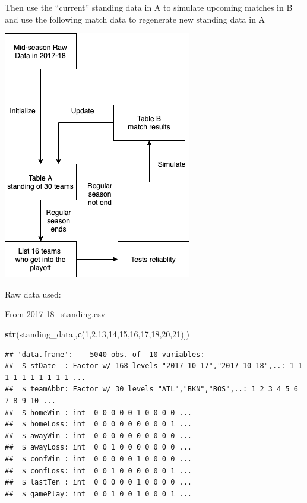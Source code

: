 \documentclass[]{article}
\newenvironment{Shaded}{\begin{snugshade}}{\end{snugshade}}
\newcommand{\KeywordTok}[1]{\textcolor[rgb]{0.13,0.29,0.53}{\textbf{#1}}}
\newcommand{\DecValTok}[1]{\textcolor[rgb]{0.00,0.00,0.81}{#1}}
\newcommand{\NormalTok}[1]{#1}
\begin{document}
Then use the ``current'' standing data in A to simulate upcoming matches
in B and use the following match data to regenerate new standing data in
A

\begin{center}\includegraphics{methods_flowchart} \end{center}

Raw data used:

From 2017-18\_standing.csv

\begin{Shaded}
\begin{Highlighting}[]
\KeywordTok{str}\NormalTok{(standing_data[,}\KeywordTok{c}\NormalTok{(}\DecValTok{1}\NormalTok{,}\DecValTok{2}\NormalTok{,}\DecValTok{13}\NormalTok{,}\DecValTok{14}\NormalTok{,}\DecValTok{15}\NormalTok{,}\DecValTok{16}\NormalTok{,}\DecValTok{17}\NormalTok{,}\DecValTok{18}\NormalTok{,}\DecValTok{20}\NormalTok{,}\DecValTok{21}\NormalTok{)])}
\end{Highlighting}
\end{Shaded}

\begin{verbatim}
## 'data.frame':    5040 obs. of  10 variables:
##  $ stDate  : Factor w/ 168 levels "2017-10-17","2017-10-18",..: 1 1 1 1 1 1 1 1 1 1 ...
##  $ teamAbbr: Factor w/ 30 levels "ATL","BKN","BOS",..: 1 2 3 4 5 6 7 8 9 10 ...
##  $ homeWin : int  0 0 0 0 0 1 0 0 0 0 ...
##  $ homeLoss: int  0 0 0 0 0 0 0 0 0 1 ...
##  $ awayWin : int  0 0 0 0 0 0 0 0 0 0 ...
##  $ awayLoss: int  0 0 1 0 0 0 0 0 0 0 ...
##  $ confWin : int  0 0 0 0 0 1 0 0 0 0 ...
##  $ confLoss: int  0 0 1 0 0 0 0 0 0 1 ...
##  $ lastTen : int  0 0 0 0 0 1 0 0 0 0 ...
##  $ gamePlay: int  0 0 1 0 0 1 0 0 0 1 ...
\end{verbatim}
\end{document}
